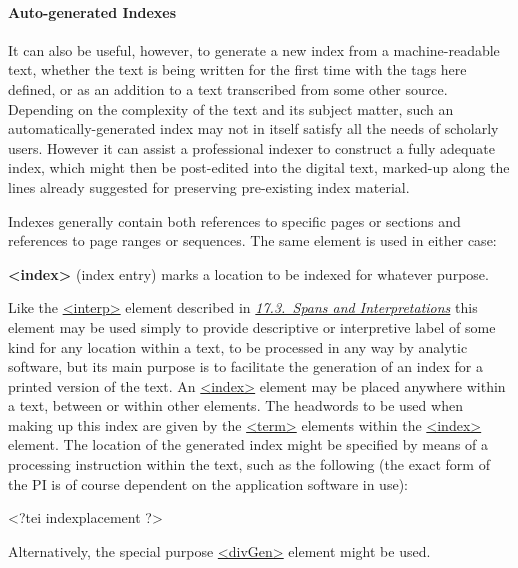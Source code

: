 \paragraph[{Auto-generated Indexes}]{Auto-generated Indexes}\label{CONOIXgen}\par
It can also be useful, however, to generate a new index from a machine-readable text, whether the text is being written for the first time with the tags here defined, or as an addition to a text transcribed from some other source. Depending on the complexity of the text and its subject matter, such an automatically-generated index may not in itself satisfy all the needs of scholarly users. However it can assist a professional indexer to construct a fully adequate index, which might then be post-edited into the digital text, marked-up along the lines already suggested for preserving pre-existing index material.\par
Indexes generally contain both references to specific pages or sections and references to page ranges or sequences. The same element is used in either case: 
\begin{sansreflist}
  
\item [\textbf{<index>}] (index entry) marks a location to be indexed for whatever purpose.
\end{sansreflist}
\par
Like the \hyperref[TEI.interp]{<interp>} element described in \textit{\hyperref[AISP]{17.3.\ Spans and Interpretations}} this element may be used simply to provide descriptive or interpretive label of some kind for any location within a text, to be processed in any way by analytic software, but its main purpose is to facilitate the generation of an index for a printed version of the text. An \hyperref[TEI.index]{<index>} element may be placed anywhere within a text, between or within other elements. The headwords to be used when making up this index are given by the \hyperref[TEI.term]{<term>} elements within the \hyperref[TEI.index]{<index>} element. The location of the generated index might be specified by means of a processing instruction within the text, such as the following (the exact form of the PI is of course dependent on the application software in use): \par\hfill\bgroup\exampleFont\vskip 10pt\begin{shaded}
\obeyspaces <?tei indexplacement ?>\end{shaded}
\par\egroup 
 Alternatively, the special purpose \hyperref[TEI.divGen]{<divGen>} element might be used.\par
